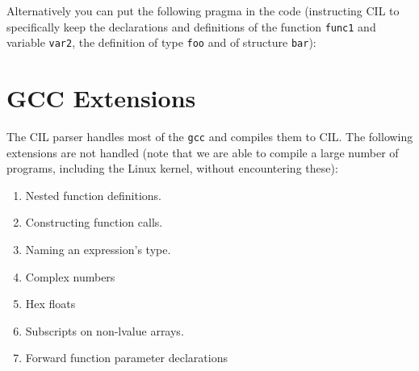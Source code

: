 \documentclass{article}
\def\t#1{{\tt #1}}
\begin{document}
 Alternatively you can put the following pragma in the code (instructing CIL
to specifically keep the declarations and definitions of the function
\t{func1} and variable \t{var2}, the definition of type \t{foo} and of
structure \t{bar}):



\section{GCC Extensions}

 The CIL parser handles most of the \t{gcc}
and compiles them to CIL. The following extensions are not handled (note that
we are able to compile a large number of programs, including the Linux kernel,
without encountering these):

\begin{enumerate}
\item Nested function definitions.
\item Constructing function calls.
\item Naming an expression's type.
\item Complex numbers
\item Hex floats
\item Subscripts on non-lvalue arrays.
\item Forward function parameter declarations
\end{enumerate}
\end{document}
